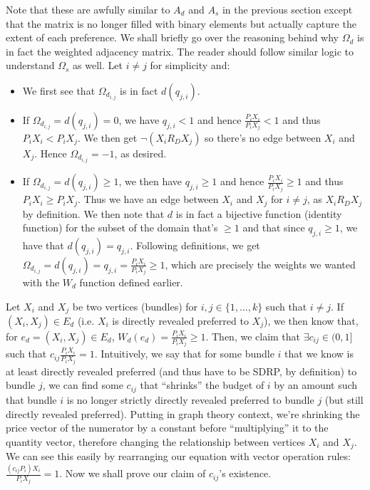 \documentclass{article} %
\begin{document}
Note that these are awfully similar to $A_d$ and $A_s$ in the previous section except that the matrix is no longer filled with binary elements but actually capture the extent of each preference. We shall briefly go over the reasoning behind why $\Omega_d$ is in fact the weighted adjacency matrix. The reader should follow similar logic to understand $\Omega_s$ as well. Let $i\not=j$ for simplicity and:
\begin{itemize}
  \item We first see that $\Omega_{d_{i,j}}$ is in fact $d(q_{j,i})$.
  \item If $\Omega_{d_{i,j}}=d(q_{j,i})=0$, we have $q_{j,i}<1$ and hence $\frac{P_iX_i}{P_iX_j}<1$ and thus $P_iX_i<P_iX_j$. We then get $\neg(X_i R_D X_j)$ so there's no edge between $X_i$ and $X_j$. Hence $\Omega_{d_{i,j}}=-1$, as desired.
  \item If $\Omega_{d_{i,j}}=d(q_{j,i})\geq1$, we then have $q_{j,i}\geq1$ and hence $\frac{P_iX_i}{P_iX_j}\geq1$ and thus $P_iX_i\geq P_iX_j$. Thus we have an edge between $X_i$ and $X_j$ for $i\not=j$, as $X_iR_D X_j$ by definition. We then note that $d$ is in fact a bijective function (identity function) for the subset of the domain that's $\geq1$ and that since $q_{j,i}\geq1$, we have that $d(q_{j,i})=q_{j,i}$. Following definitions, we get $\Omega_{d_{i,j}}=d(q_{j,i})=q_{j,i}=\frac{P_iX_i}{P_iX_j}\geq1$, which are precisely the weights we wanted with the $W_d$ function defined earlier.
\end{itemize}
Let $X_i$ and $X_j$ be two vertices (bundles) for $i,j\in\{1,\ldots,k\}$ such that $i\not=j$. If $(X_i, X_j)\in E_d$ (i.e. $X_i$ is directly revealed preferred to $X_j$), we then know that, for $e_d=(X_i, X_j)\in E_d$, $W_d(e_d)=\frac{P_iX_i}{P_iX_j}\geq1$. Then, we claim that $\exists c_{ij}\in(0,1]$ such that $c_{ij}\frac{P_iX_i}{P_iX_j}=1$. Intuitively, we say that for some bundle $i$ that we know is at least directly revealed preferred (and thus have to be SDRP, by definition) to bundle $j$, we can find some $c_{ij}$ that ``shrinks'' the budget of $i$ by an amount such that bundle $i$ is no longer strictly directly revealed preferred to bundle $j$ (but still directly revealed preferred). Putting in graph theory context, we're shrinking the price vector of the numerator by a constant before ``multiplying'' it to the quantity vector, therefore changing the relationship between vertices $X_i$ and $X_j$. We can see this easily by rearranging our equation with vector operation rules: $\frac{(c_{ij}P_i)X_i}{P_iX_j}=1$. Now we shall prove our claim of $c_{ij}$'s existence.
\end{document}
